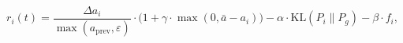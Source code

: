 \begin{equation}
    r_i(t) = \frac{\Delta a_i}{\max(a_{\text{prev}}, \varepsilon)} \cdot \bigl(1 + \gamma \cdot \max(0, \bar{a} - a_i)\bigr) - \alpha \cdot \text{KL}(P_i \| P_g) - \beta \cdot f_i,
\end{equation}
